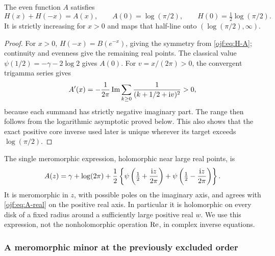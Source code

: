 \begin{corollary}
\label{ojf:cor:core-global}
The even function $A$ satisfies
\[
 H(x)+H(-x)=A(x),\qquad A(0)=\log(\pi/2),
 \qquad H(0)=\tfrac12\log(\pi/2).
\]
It is strictly increasing for $x>0$ and maps that half-line onto
$(\log(\pi/2),\infty)$.
\end{corollary}
\begin{proof}
For $x>0$, $H(-x)=B(e^{-x})$, giving the symmetry from
\eqref{ojf:eq:H-A}; continuity and evenness give the remaining real
points. The classical value $\psi(1/2)=-\gamma-2\log2$ gives $A(0)$.
For $v=x/(2\pi)>0$, the convergent trigamma series gives
\[
 A'(x)=-\frac1{2\pi}\operatorname{Im}\sum_{k\ge0}\frac1{(k+1/2+\mathrm{i} v)^2}>0,
\]
because each summand has strictly negative imaginary part. The range
then follows from the logarithmic asymptotic proved below. This also
shows that the exact positive core inverse used later is unique wherever
its target exceeds $\log(\pi/2)$.
\end{proof}

The single meromorphic expression, holomorphic near large real points, is
\begin{equation}\label{ojf:eq:A-holomorphic}
 A(z)=\gamma+\log(2\pi)+\frac12
    \left\{\psi\left(\tfrac12+\frac{\mathrm{i} z}{2\pi}\right)
          +\psi\left(\tfrac12-\frac{\mathrm{i} z}{2\pi}\right)\right\}.
\end{equation}
It is meromorphic in $z$, with possible poles on the imaginary axis,
and agrees with \eqref{ojf:eq:A-real} on the positive real axis. In
particular it is holomorphic on every disk of a fixed radius around a
sufficiently large positive real $w$. We use this expression, not the
nonholomorphic operation $\operatorname{Re}$, in complex inverse equations.

\subsubsection{A meromorphic minor at the previously excluded order}

